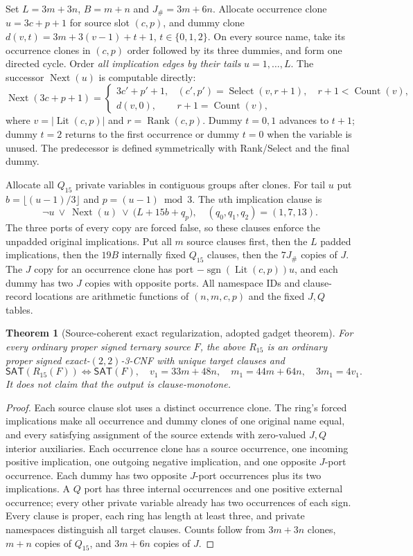 \documentclass[11pt]{article}
\newtheorem{theorem}{Theorem}
\newcommand{\SAT}{\mathsf{SAT}}
\begin{document}
Set $L=3m+3n$, $B=m+n$ and $J_\#=3m+6n$. Allocate occurrence clone $u=3c+p+1$ for source slot $(c,p)$, and dummy clone $d(v,t)=3m+3(v-1)+t+1$, $t\in\{0,1,2\}$. On every source name, take its occurrence clones in $(c,p)$ order followed by its three dummies, and form one directed cycle. Order \emph{all implication edges by their tails} $u=1,\ldots,L$. The successor $\operatorname{Next}(u)$ is computable directly:
\[
\operatorname{Next}(3c+p+1)=\begin{cases}
 3c'+p'+1,&(c',p')=\operatorname{Select}(v,r+1),\quad r+1<\operatorname{Count}(v),\\
 d(v,0),&r+1=\operatorname{Count}(v),
\end{cases}
\]
where $v=|\operatorname{Lit}(c,p)|$ and $r=\operatorname{Rank}(c,p)$. Dummy $t=0,1$ advances to $t+1$; dummy $t=2$ returns to the first occurrence or dummy $t=0$ when the variable is unused. The predecessor is defined symmetrically with Rank/Select and the final dummy.

Allocate all $Q_{15}$ private variables in contiguous groups after clones. For tail $u$ put $b=\lfloor(u-1)/3\rfloor$ and $p=(u-1)\bmod3$. The $u$th implication clause is
\[
\boxed{\neg u\ \vee\ \operatorname{Next}(u)\ \vee\ \bigl(L+15b+q_p\bigr)},\quad(q_0,q_1,q_2)=(1,7,13).
\]
The three ports of every copy are forced false, so these clauses enforce the unpadded original implications. Put all $m$ source clauses first, then the $L$ padded implications, then the $19B$ internally fixed $Q_{15}$ clauses, then the $7J_\#$ copies of $J$. The $J$ copy for an occurrence clone has port $-\operatorname{sgn}(\operatorname{Lit}(c,p))u$, and each dummy has two $J$ copies with opposite ports. All namespace IDs and clause-record locations are arithmetic functions of $(n,m,c,p)$ and the fixed $J,Q$ tables.

\begin{theorem}[Source-coherent exact regularization, adopted gadget theorem]
For every ordinary proper signed ternary source $F$, the above $R_{15}$ is an ordinary proper signed exact-$(2,2)$-3-CNF with unique target clauses and
\[
 \SAT(R_{15}(F))\iff\SAT(F),\quad
 v_1=33m+48n,\quad m_1=44m+64n,\quad 3m_1=4v_1.
\]
It does not claim that the output is clause-monotone.
\end{theorem}
\begin{proof}
Each source clause slot uses a distinct occurrence clone. The ring's forced implications make all occurrence and dummy clones of one original name equal, and every satisfying assignment of the source extends with zero-valued $J,Q$ interior auxiliaries. Each occurrence clone has a source occurrence, one incoming positive implication, one outgoing negative implication, and one opposite $J$-port occurrence. Each dummy has two opposite $J$-port occurrences plus its two implications. A $Q$ port has three internal occurrences and one positive external occurrence; every other private variable already has two occurrences of each sign. Every clause is proper, each ring has length at least three, and private namespaces distinguish all target clauses. Counts follow from $3m+3n$ clones, $m+n$ copies of $Q_{15}$, and $3m+6n$ copies of $J$.
\end{proof}
\end{document}

